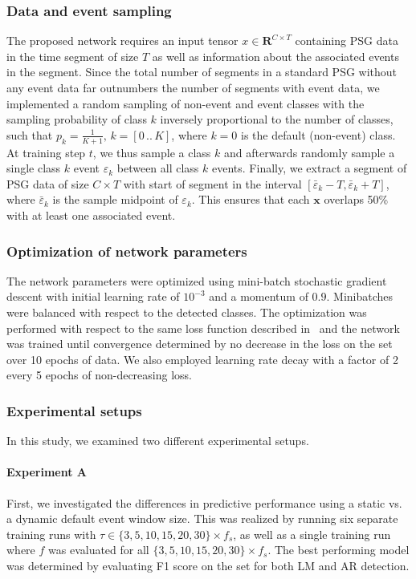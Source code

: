 \subsubsection{Data and event sampling}
The proposed network requires an input tensor $x \in \mathbf{R}^{C \times T}$ containing \ac{PSG} data in the time segment of size $T$ as well as information about the associated events in the segment.
Since the total number of segments in a standard \ac{PSG} without any event data far outnumbers the number of segments with event data, we implemented a random sampling of non-event and event classes with the sampling probability of class $k$ inversely proportional to the number of classes, such that $p_k = \frac{1}{K+1},\,k=\left[0\,..\,K \right]$, where $k=0$ is the default (non-event) class.
At training step $t$, we thus sample a class $k$ and afterwards randomly sample a single class $k$ event $\varepsilon_{k}$ between all class $k$ events.
Finally, we extract a segment of \ac{PSG} data of size $C \times T$ with start of segment in the interval $\left[ \bar{\varepsilon}_{k} - T, \bar{\varepsilon}_{k} + T \right]$, where $\bar{\varepsilon}_{k}$ is the sample midpoint of $\varepsilon_{k}$.
This ensures that each $\mathbf{x}$ overlaps 50\% with at least one associated event.

\subsubsection{Optimization of network parameters}
The network parameters were optimized using mini-batch stochastic gradient descent with initial learning rate of $10^{-3}$ and a momentum of $0.9$. Minibatches were balanced with respect to the detected classes. The optimization was performed with respect to the same loss function described in~\cite{Chambon2018b,Chambon2019} and the network was trained until convergence determined by no decrease in the loss on the \eval{} set over 10 epochs of \train{} data. We also employed learning rate decay with a factor of 2 every 5 epochs of non-decreasing \eval{} loss.

\subsubsection{Experimental setups}
In this study, we examined two different experimental setups. 
\paragraph{Experiment A} First, we investigated the differences in predictive performance using a static vs. a dynamic default event window size. This was realized by running six separate training runs with $\tau \in \lbrace 3, 5, 10, 15, 20, 30 \rbrace \times f_{s}$, as well as a single training run where $f$ was evaluated for all $\lbrace 3, 5, 10, 15, 20, 30 \rbrace \times f_{s}$. The best performing model was determined by evaluating F1 score on the \eval{} set for both LM and AR detection. 
